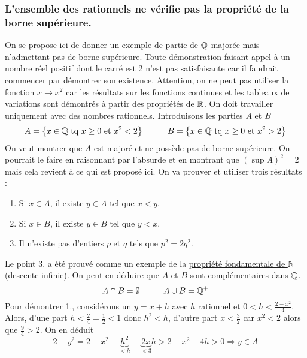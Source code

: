\subsubsection{L'ensemble des rationnels ne vérifie pas la propriété de la borne supérieure.} \label{contrexbsup}
On se propose ici de donner un exemple de partie de $\mathbb{Q}$ majorée mais n'admettant pas de borne supérieure. Toute démonstration faisant appel à un nombre réel positif dont le carré est $2$ n'est pas satisfaisante car il faudrait commencer par démontrer son existence. Attention, on ne peut pas utiliser la fonction $x\rightarrow x^2$ car les résultats sur les fonctions continues et les tableaux de variations sont démontrés à partir des propriétés de $\mathbb{R}$. On doit travailler uniquement avec des nombres rationnels.\newline
Introduisons les parties $A$ et $B$
\begin{displaymath}
  A = \left\lbrace x\in\mathbb{Q}\text{ tq } x\geq 0 \text{ et } x^2 < 2\right\rbrace \hspace{1cm} 
  B = \left\lbrace x\in\mathbb{Q}\text{ tq } x\geq 0 \text{ et } x^2 > 2\right\rbrace
\end{displaymath}
On veut montrer que $A$ est majoré et ne possède pas de borne supérieure. On pourrait le faire en raisonnant par l'absurde et en montrant que $(\sup A)^2=2$ mais cela revient à ce qui est proposé ici.\newline 
On va prouver et utiliser trois résultats :
\begin{enumerate}
 \item Si $x\in A$, il existe $y\in A$ tel que $x<y$. 
 \item Si $x\in B$, il existe $y\in B$ tel que $y<x$.
 \item Il n'existe pas d'entiers $p$ et $q$ tels que $p^2=2q^2$.
\end{enumerate}
Le point 3. a été prouvé comme un exemple de la \href{\baseurl C2007.pdf}{propriété fondamentale de $\mathbb{N}$} (descente infinie). On peut en déduire que $A$ et $B$ sont complémentaires dans $\mathbb{Q}$.
\begin{displaymath}
  A \cap B = \emptyset \hspace{1cm} A \cup B = \mathbb{Q}^+
\end{displaymath}
Pour démontrer 1., considérons un $y=x+h$ avec $h$ rationnel et $0<h<\frac{2-x^2}{4}$.\newline
Alors, d'une part $h<\frac{2}{4}=\frac{1}{2}<1$ donc $h^2<h$, d'autre part $x<\frac{3}{2}$ car $x^2<2$ alors que $\frac{9}{4}>2$. On en déduit 
\begin{displaymath}
 2-y^2 = 2-x^2 -\underset{< h}{\underbrace{h^2}} - \underset{<3}{\underbrace{2x}}h
> 2-x^2 -4h > 0 \Rightarrow y \in A
\end{displaymath}
